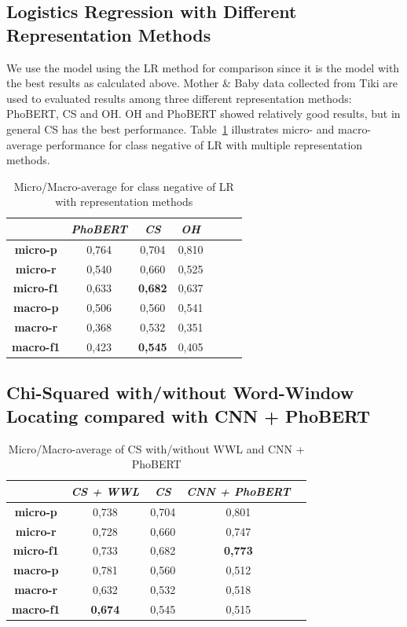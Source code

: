 \subsection{Logistics Regression with Different Representation Methods}
We use the model using the LR method for comparison since it is the model with the best results as calculated above. Mother \& Baby data collected from Tiki are used to evaluated results among three different representation methods: PhoBERT, CS and OH.
OH and PhoBERT showed relatively good results, but in general CS has the best performance. Table~\ref{tab:lr} illustrates micro- and macro-average performance for class negative of LR with multiple representation methods.

\begin{table}[h]
\centering
\begin{tabular}{|c|c|c|c|c|c|c|}
\hline
                  & \textit{\textbf{PhoBERT}} & \textit{\textbf{CS}} & \textit{\textbf{OH}}\\ \hline
\textbf{micro-p}  & 0,764 & 0,704          & 0,810 \\ \hline
\textbf{micro-r}  & 0,540 & 0,660          & 0,525 \\ \hline
\textbf{micro-f1} & 0,633 & \textbf{0,682} & 0,637 \\ \hline
\textbf{macro-p}  & 0,506 & 0,560          & 0,541 \\ \hline
\textbf{macro-r}  & 0,368 & 0,532          & 0,351 \\ \hline
\textbf{macro-f1} & 0,423 & \textbf{0,545} & 0,405 \\ \hline
\end{tabular}
\caption{Micro/Macro-average for class negative of LR with representation methods}
\label{tab:lr}
\end{table}

\subsection{Chi-Squared with/without Word-Window Locating compared with CNN + PhoBERT}

\begin{table}[h]
\centering
\begin{tabular}{|c|c|c|c|c|}
\hline               
& \textit{\textbf{CS + WWL}} & \textit{\textbf{CS}} & \textit{\textbf{CNN + PhoBERT}}\\ \hline
\textbf{micro-p}  & 0,738          & 0,704 & 0,801          \\ \hline
\textbf{micro-r}  & 0,728          & 0,660 & 0,747          \\ \hline
\textbf{micro-f1} & 0,733          & 0,682 & \textbf{0,773} \\ \hline
\textbf{macro-p}  & 0,781          & 0,560 & 0,512          \\ \hline
\textbf{macro-r}  & 0,632          & 0,532 & 0,518          \\ \hline
\textbf{macro-f1} & \textbf{0,674} & 0,545 & 0,515          \\ \hline
\end{tabular}
\caption{Micro/Macro-average of CS with/without WWL and CNN + PhoBERT}
\label{tab:cswwl}
\end{table}

